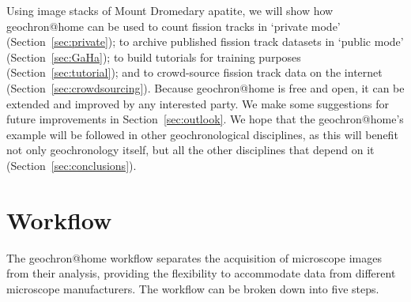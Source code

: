 \documentclass[gchron, manuscript]{copernicus}
\begin{document}
Using image stacks of Mount Dromedary apatite, we will show how
geochron@home can be used to count fission tracks in `private mode'
(Section~\ref{sec:private}); to archive published fission track
datasets in `public mode' (Section~\ref{sec:GaHa}); to build tutorials
for training purposes (Section~\ref{sec:tutorial}); and to
crowd-source fission track data on the internet
(Section~\ref{sec:crowdsourcing}). Because geochron@home is free and
open, it can be extended and improved by any interested party. We make
some suggestions for future improvements in
Section~\ref{sec:outlook}. We hope that the geochron@home's example
will be followed in other geochronological disciplines, as this will
benefit not only geochronology itself, but all the other disciplines
that depend on it (Section~\ref{sec:conclusions}).

\section{Workflow}\label{sec:architecture}

The geochron@home workflow separates the acquisition of microscope
images from their analysis, providing the flexibility to accommodate
data from different microscope manufacturers. The workflow can be
broken down into five steps.
\end{document}
